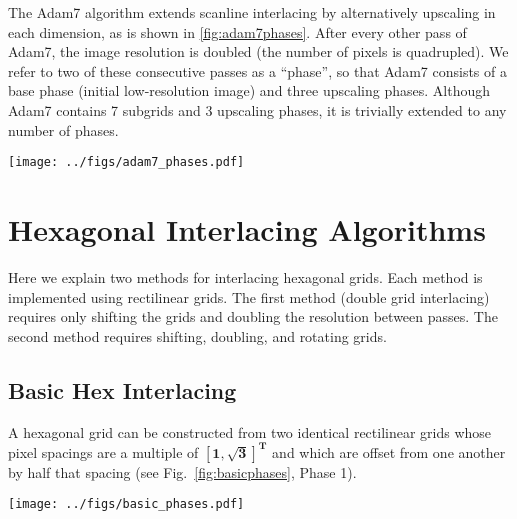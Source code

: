 \documentclass[aip, amsmath, amssymb, nobibnotes, nofootinbib, citeautoscript, reprint, superscriptaddress]{revtex4-1}
\begin{document}
    The Adam7 algorithm extends scanline interlacing by alternatively upscaling in each dimension, as is shown in \autoref{fig:adam7phases}.
    After every other pass of Adam7, the image resolution is doubled (the number of pixels is quadrupled).
    We refer to two of these consecutive passes as a ``phase'', so that Adam7 consists of a base phase (initial low-resolution image) and three upscaling phases.
    Although Adam7 contains 7 subgrids and 3 upscaling phases, it is trivially extended to any number of phases.


    \begin{figure*}
        \centering
        \texttt{[image: ../figs/adam7\_phases.pdf]}
            \caption{
                \label{fig:adam7phases}
                \textbf{The Adam7 interlacing method for rectilinear grids.}
                Starting from an initial grid (Phase 1), each subsequent phase consists of doubling the columns (blue) then rows (green) of the grid.
            }
    \end{figure*}


    \section{Hexagonal Interlacing Algorithms}
    \label{sec:hexinter}

    Here we explain two methods for interlacing hexagonal grids.
    Each method is implemented using rectilinear grids.
    The first method (double grid interlacing) requires only shifting the grids and doubling the resolution between passes.
    The second method requires shifting, doubling, and rotating grids.


    \subsection{\label{ssec:double-grid-interlacing}Basic Hex Interlacing}

    A hexagonal grid can be constructed from two identical rectilinear grids whose pixel spacings are a multiple of $\mathbf{\left[1, \sqrt{3}\right]^T}$ and which are offset from one another by half that spacing (see Fig.~\ref{fig:basicphases}, Phase 1).

    \begin{figure*}
        \centering
        \texttt{[image: ../figs/basic\_phases.pdf]}
        \caption{
        \label{fig:basicphases} Refining a hex grid through multiple interlacing passes.
        In each pass, previously sampled points are shown in gray.
        Each pass consists of multiple rectilinear scans with aspect ratio $\mathbf{\sqrt{3}}$.
        }
    \end{figure*}
\end{document}
